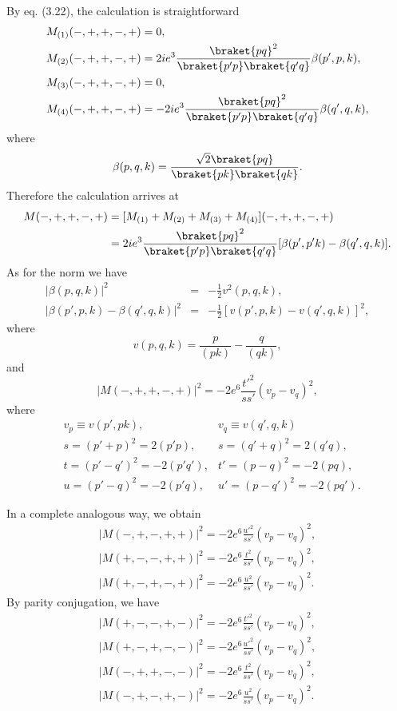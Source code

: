 By eq. (3.22), the calculation is straightforward
\begin{align}
M_{(1)}(-,+,+,-,+)&=0,\nonumber\\
M_{(2)}(-,+,+,-,+)&=2ie^3\frac{\braket{pq}^2}{\braket{p'p}\braket{q'q}}\beta(p',p,k),\nonumber\\
M_{(3)}(-,+,+,-,+)&=0,\nonumber\\
M_{(4)}(-,+,+,-,+)&=-2ie^3\frac{\braket{pq}^2}{\braket{p'p}\braket{q'q}}\beta(q',q,k),
\end{align}
where 
\begin{equation}
\beta(p,q,k)=\frac{\sqrt{2}\braket{pq}}{\braket{pk}\braket{qk}}.
\end{equation}
Therefore the calculation arrives at
\begin{align}
M(-,+,+,-,+)&=[M_{(1)}+M_{(2)}+M_{(3)}+M_{(4)}](-,+,+,-,+)\nonumber\\
&=2ie^3\frac{\braket{pq}^2}{\braket{p'p}\braket{q'q}}[\beta(p',p'k)-\beta(q',q,k)].
\end{align}
As for the norm we have
\begin{eqnarray}
|\beta(p,q,k)|^2&=&-\frac{1}{2}v^2(p,q,k),\nonumber\\
|\beta(p',p,k)-\beta(q',q,k)|^2&=&-\frac{1}{2}[v(p',p,k)-v(q',q,k)]^2,
\end{eqnarray}
where
\begin{equation}
v(p,q,k)=\frac{p}{(pk)}-\frac{q}{(qk)},
\end{equation}
and
\begin{equation}
|M(-,+,+,-,+)|^2=-2e^6\frac{t'^2}{ss'}(v_p-v_q)^2,
\end{equation}
where 
\begin{eqnarray}
&v_p\equiv v(p',pk), &v_q\equiv v(q',q,k) \nonumber\\
&s=(p'+p)^2=2(p'p), &s=(q'+q)^2=2(q'q),\nonumber\\
&t=(p'-q')^2=-2(p'q'), &t'=(p-q)^2=-2(pq),\nonumber\\
&u=(p'-q)^2=-2(p'q), &u'=(p-q')^2=-2(pq').
\end{eqnarray}

In a complete analogous way, we obtain
\begin{eqnarray}
|M(-,+,-,+,+)|^2=-2e^6\frac{u'^2}{ss'}(v_p-v_q)^2,\nonumber\\
|M(+,-,-,+,+)|^2=-2e^6\frac{t^2}{ss'}(v_p-v_q)^2,\nonumber\\
|M(+,-,+,-,+)|^2=-2e^6\frac{u^2}{ss'}(v_p-v_q)^2.
\end{eqnarray}
By parity conjugation, we have 
\begin{eqnarray}
|M(+,-,-,+,-)|^2=-2e^6\frac{t'^2}{ss'}(v_p-v_q)^2,\nonumber\\
|M(+,-,+,-,-)|^2=-2e^6\frac{u'^2}{ss'}(v_p-v_q)^2,\nonumber\\
|M(-,+,+,-,-)|^2=-2e^6\frac{t^2}{ss'}(v_p-v_q)^2,\nonumber\\
|M(-,+,-,+,-)|^2=-2e^6\frac{u^2}{ss'}(v_p-v_q)^2.
\end{eqnarray}

